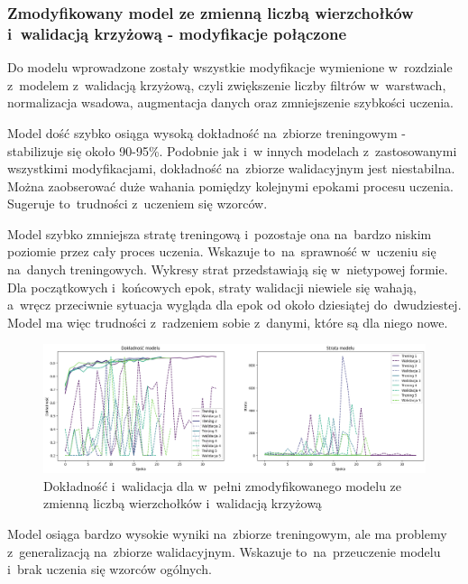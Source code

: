 \subsubsection{Zmodyfikowany model ze zmienną liczbą wierzchołków i~walidacją krzyżową - modyfikacje połączone}

Do modelu wprowadzone zostały wszystkie modyfikacje wymienione w~rozdziale z~modelem z~walidacją krzyżową,
czyli zwiększenie liczby filtrów w~warstwach, normalizacja wsadowa, augmentacja danych oraz zmniejszenie szybkości uczenia.

Model dość szybko osiąga wysoką dokładność na~zbiorze treningowym - stabilizuje się około 90-95\%.
Podobnie jak i~w innych modelach z~zastosowanymi wszystkimi modyfikacjami,
dokładność na~zbiorze walidacyjnym jest niestabilna.
Można zaobserować duże wahania pomiędzy kolejnymi epokami procesu uczenia.
Sugeruje to~trudności z~uczeniem się wzorców.

Model szybko zmniejsza stratę treningową i~pozostaje ona na~bardzo niskim poziomie przez cały proces uczenia.
Wskazuje to~na~sprawność w~uczeniu się na~danych treningowych.
Wykresy strat przedstawiają się w~nietypowej formie.
Dla początkowych i~końcowych epok, straty walidacji niewiele się wahają,
a~wręcz przeciwnie sytuacja wygląda dla epok od około dziesiątej do~dwudziestej.
Model ma więc trudności z~radzeniem sobie z~danymi, które są dla niego nowe.

\begin{figure}[ht]
	\centering
	\includegraphics[width=15.5cm]{resources/tests/images/v4/multiple_edges_crossvalid_img.png}
	\caption{Dokładność i~walidacja dla w~pełni zmodyfikowanego modelu ze zmienną liczbą wierzchołków i~walidacją krzyżową}
	\label{Fig:tests-csvar-2a}
\end{figure}
\FloatBarrier

Model osiąga bardzo wysokie wyniki na~zbiorze treningowym,
ale ma problemy z~generalizacją na~zbiorze walidacyjnym.
Wskazuje to~na~przeuczenie modelu i~brak uczenia się wzorców ogólnych.

